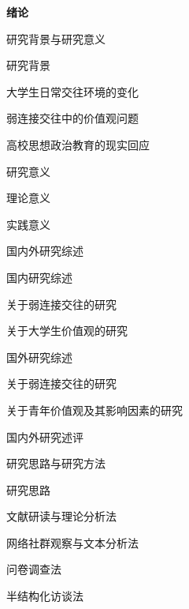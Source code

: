 \begin{thesisframework}
\begin{thesisoutline}
  \item \textbf{绪论}
  \begin{thesisoutline}
    \item 研究背景与研究意义
    \begin{thesisoutline}
      \item 研究背景
      \begin{thesisoutline}
        \item 大学生日常交往环境的变化
        \item 弱连接交往中的价值观问题
        \item 高校思想政治教育的现实回应
      \end{thesisoutline}
      \item 研究意义
      \begin{thesisoutline}
        \item 理论意义
        \item 实践意义
      \end{thesisoutline}
    \end{thesisoutline}
    \item 国内外研究综述
    \begin{thesisoutline}
      \item 国内研究综述
      \begin{thesisoutline}
        \item 关于弱连接交往的研究
        \item 关于大学生价值观的研究
      \end{thesisoutline}
      \item 国外研究综述
      \begin{thesisoutline}
        \item 关于弱连接交往的研究
        \item 关于青年价值观及其影响因素的研究
      \end{thesisoutline}
      \item 国内外研究述评
    \end{thesisoutline}
    \item 研究思路与研究方法
    \begin{thesisoutline}
      \item 研究思路
      \item 文献研读与理论分析法
      \item 网络社群观察与文本分析法
      \item 问卷调查法
      \item 半结构化访谈法

\end{thesisoutline}
\end{thesisoutline}
\end{thesisoutline}
\end{thesisframework}
